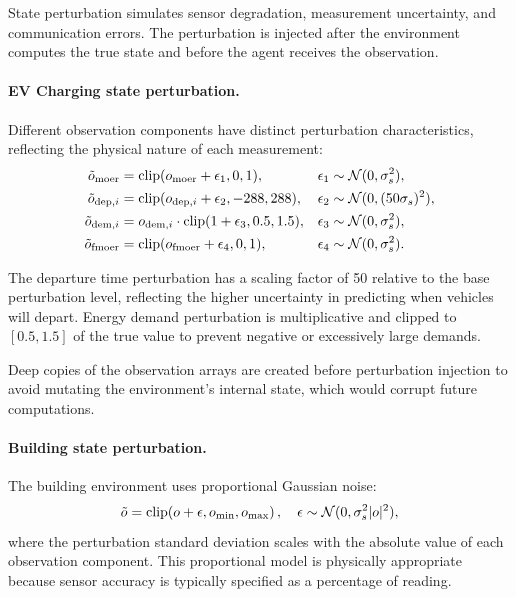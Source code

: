 State perturbation simulates sensor degradation, measurement uncertainty, and communication errors. The perturbation is injected after the environment computes the true state and before the agent receives the observation.

\paragraph{EV Charging state perturbation.} Different observation components have distinct perturbation characteristics, reflecting the physical nature of each measurement:
\begin{align}
    \tilde{o}_{\text{moer}} &= \operatorname{clip}(o_{\text{moer}} + \epsilon_1, 0, 1), & \epsilon_1 &\sim \mathcal{N}(0, \sigma_s^2), \label{eq:ev_obs_moer} \\
    \tilde{o}_{\text{dep},i} &= \operatorname{clip}(o_{\text{dep},i} + \epsilon_2, -288, 288), & \epsilon_2 &\sim \mathcal{N}(0, (50\sigma_s)^2), \label{eq:ev_obs_dep} \\
    \tilde{o}_{\text{dem},i} &= o_{\text{dem},i} \cdot \operatorname{clip}(1 + \epsilon_3, 0.5, 1.5), & \epsilon_3 &\sim \mathcal{N}(0, \sigma_s^2), \label{eq:ev_obs_dem} \\
    \tilde{o}_{\text{fmoer}} &= \operatorname{clip}(o_{\text{fmoer}} + \epsilon_4, 0, 1), & \epsilon_4 &\sim \mathcal{N}(0, \sigma_s^2). \label{eq:ev_obs_fmoer}
\end{align}

The departure time perturbation has a scaling factor of 50 relative to the base perturbation level, reflecting the higher uncertainty in predicting when vehicles will depart. Energy demand perturbation is multiplicative and clipped to $[0.5, 1.5]$ of the true value to prevent negative or excessively large demands.

\begin{remark}
Deep copies of the observation arrays are created before perturbation injection to avoid mutating the environment's internal state, which would corrupt future computations.
\end{remark}

\paragraph{Building state perturbation.} The building environment uses proportional Gaussian noise:
\begin{equation}
    \tilde{o} = \operatorname{clip}\!\left(o + \epsilon, o_{\min}, o_{\max}\right), \quad \epsilon \sim \mathcal{N}(0, \sigma_s^2 |o|^2),
    \label{eq:bldg_obs_noise}
\end{equation}
where the perturbation standard deviation scales with the absolute value of each observation component. This proportional model is physically appropriate because sensor accuracy is typically specified as a percentage of reading.

